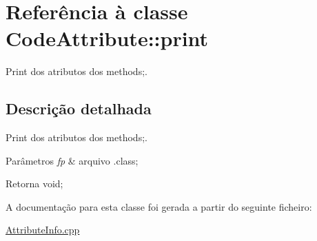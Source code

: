 \hypertarget{class_code_attribute_1_1print}{}\section{Referência à classe Code\+Attribute\+:\+:print}
\label{class_code_attribute_1_1print}


Print dos atributos dos methods;.  




\subsection{Descrição detalhada}
Print dos atributos dos methods;. 


\begin{DoxyParams}{Parâmetros}
{\em fp} & arquivo .class; \\
\hline
\end{DoxyParams}
\begin{DoxyReturn}{Retorna}
void; 
\end{DoxyReturn}


A documentação para esta classe foi gerada a partir do seguinte ficheiro\+:\begin{DoxyCompactItemize}
\item 
\hyperlink{_attribute_info_8cpp}{Attribute\+Info.\+cpp}\end{DoxyCompactItemize}
